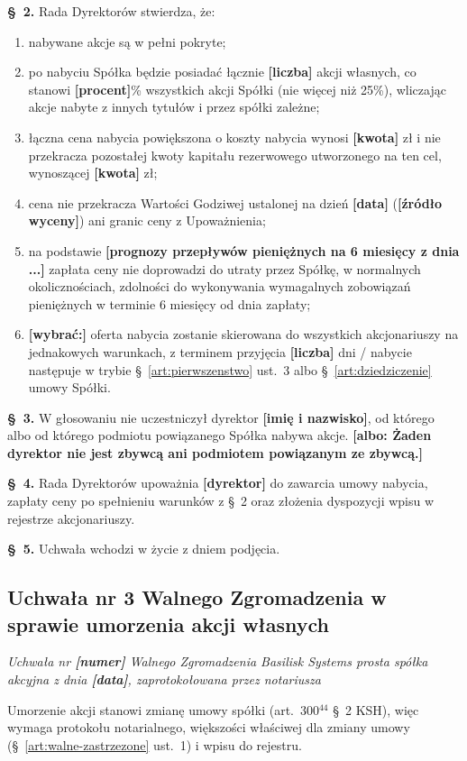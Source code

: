 \documentclass[12pt,a4paper]{report}
\newcommand{\field}[1]{\textbf{[#1]}}
\newcommand{\CompanyFull}{Basilisk Systems prosta spółka akcyjna}
\begin{document}
\textbf{§~2.} Rada Dyrektorów stwierdza, że:
\begin{enumerate}
  \item nabywane akcje są w pełni pokryte;
  \item po nabyciu Spółka będzie posiadać łącznie \field{liczba} akcji własnych, co stanowi \field{procent}\% wszystkich akcji Spółki (nie więcej niż 25\%), wliczając akcje nabyte z innych tytułów i przez spółki zależne;
  \item łączna cena nabycia powiększona o koszty nabycia wynosi \field{kwota} zł i nie przekracza pozostałej kwoty kapitału rezerwowego utworzonego na ten cel, wynoszącej \field{kwota} zł;
  \item cena nie przekracza Wartości Godziwej ustalonej na dzień \field{data} (\field{źródło wyceny}) ani granic ceny z Upoważnienia;
  \item na podstawie \field{prognozy przepływów pieniężnych na 6 miesięcy z dnia ...} zapłata ceny nie doprowadzi do utraty przez Spółkę, w normalnych okolicznościach, zdolności do wykonywania wymagalnych zobowiązań pieniężnych w terminie 6 miesięcy od dnia zapłaty;
  \item \field{wybrać:} oferta nabycia zostanie skierowana do wszystkich akcjonariuszy na jednakowych warunkach, z terminem przyjęcia \field{liczba} dni / nabycie następuje w trybie §~\ref{art:pierwszenstwo} ust.~3 albo §~\ref{art:dziedziczenie} umowy Spółki.
\end{enumerate}

\textbf{§~3.} W głosowaniu nie uczestniczył dyrektor \field{imię i nazwisko}, od którego albo od którego podmiotu powiązanego Spółka nabywa akcje. \field{albo: Żaden dyrektor nie jest zbywcą ani podmiotem powiązanym ze zbywcą.}

\textbf{§~4.} Rada Dyrektorów upoważnia \field{dyrektor} do zawarcia umowy nabycia, zapłaty ceny po spełnieniu warunków z §~2 oraz złożenia dyspozycji wpisu w rejestrze akcjonariuszy.

\textbf{§~5.} Uchwała wchodzi w życie z dniem podjęcia.

\subsection*{Uchwała nr 3 Walnego Zgromadzenia w sprawie umorzenia akcji własnych}

\textit{Uchwała nr \field{numer} Walnego Zgromadzenia \CompanyFull{} z dnia \field{data}, zaprotokołowana przez notariusza}

Umorzenie akcji stanowi zmianę umowy spółki (art.~300$^{44}$ §~2 KSH), więc wymaga protokołu notarialnego, większości właściwej dla zmiany umowy (§~\ref{art:walne-zastrzezone} ust.~1) i wpisu do rejestru.
\end{document}

